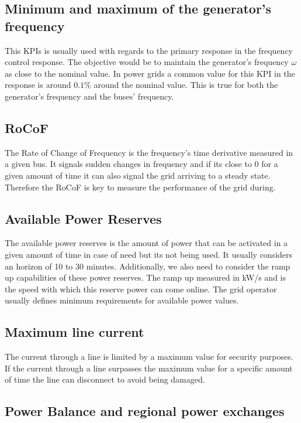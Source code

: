 \documentclass{article}
\begin{document}
\subsection*{Minimum and maximum of the generator's frequency}

This KPIs is usually used with regards to the primary response in the frequency control response. The objective would be to maintain the generator's frequency $\omega$ as close to the nominal value. In power grids a common value for this KPI in the response is around $0.1\%$ around the nominal value. This is true for both the generator's frequency and the buses' frequency.

\subsection*{RoCoF}

The Rate of Change of Frequency is the frequency's time derivative measured in a given bus. It signals sudden changes in frequency and if its close to $0$ for a given amount of time it can also signal the grid arriving to a steady state. Therefore the RoCoF is key to measure the performance of the grid during. 

\subsection*{Available Power Reserves}

The available power reserves is the amount of power that can be activated in a given amount of time in case of need but its not being used. It usually considers an horizon of 10 to 30 minutes. Additionally, we also need to consider the ramp up capabilities of these power reserves. The ramp up measured in kW/s and is the speed with which this reserve power can come online. The grid operator usually defines minimum requirements for available power values.

\subsection*{Maximum line current}

The current through a line is limited by a maximum value for security purposes. If the current through a line surpasses the maximum value for a specific amount of time the line can disconnect to avoid being damaged.

\subsection*{Power Balance and regional power exchanges}
\end{document}
